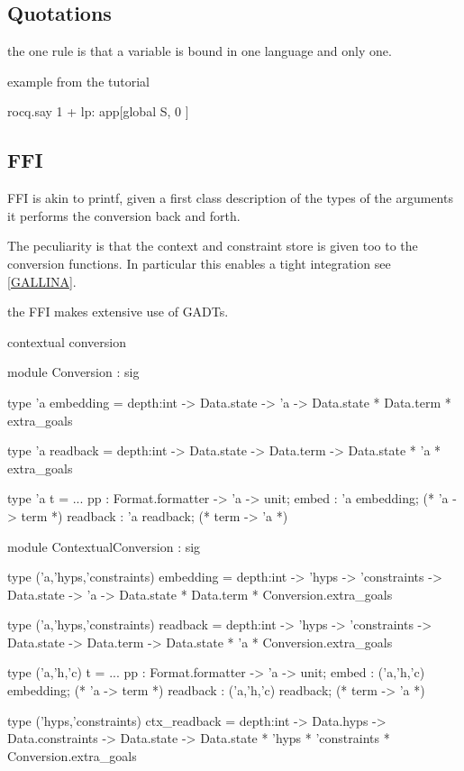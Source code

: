 \documentclass[a4paper, 11pt]{book}
\begin{document}
\subsection{Quotations}

the one rule is that a variable is bound in one language and only
one.

example from the tutorial

\begin{elpicode}
  rocq.say {{ 1 + lp:{{ app[global S, {{ 0 }} ]  }}   }}
\end{elpicode}


\subsection{FFI}\label{FFI}

FFI is akin to printf, given a first class description of
the types of the arguments it performs the conversion
back and forth.

The peculiarity is that the context and constraint store
is given too to the conversion functions. In particular
this enables a tight integration see \ref{GALLINA}.

the FFI makes extensive use of GADTs.

contextual conversion

\begin{ocamlcode}
module Conversion : sig

type 'a embedding =
  depth:int ->
  Data.state -> 'a -> Data.state * Data.term * extra_goals

type 'a readback =
  depth:int ->
  Data.state -> Data.term -> Data.state * 'a * extra_goals

type 'a t = {
  ...
  pp : Format.formatter -> 'a -> unit;
  embed : 'a embedding;   (* 'a -> term *)
  readback : 'a readback; (* term -> 'a *)
}
\end{ocamlcode}


\begin{ocamlcode}
module ContextualConversion : sig

type ('a,'hyps,'constraints) embedding =
  depth:int -> 'hyps -> 'constraints ->
  Data.state -> 'a -> Data.state * Data.term * Conversion.extra_goals

type ('a,'hyps,'constraints) readback =
  depth:int -> 'hyps -> 'constraints ->
  Data.state -> Data.term -> Data.state * 'a * Conversion.extra_goals

type ('a,'h,'c) t = {
  ...
  pp : Format.formatter -> 'a -> unit;
  embed : ('a,'h,'c) embedding;   (* 'a -> term *)
  readback : ('a,'h,'c) readback; (* term -> 'a *)
}

type ('hyps,'constraints) ctx_readback =
  depth:int -> Data.hyps -> Data.constraints ->
  Data.state -> Data.state * 'hyps * 'constraints * Conversion.extra_goals
\end{ocamlcode}
\end{document}

